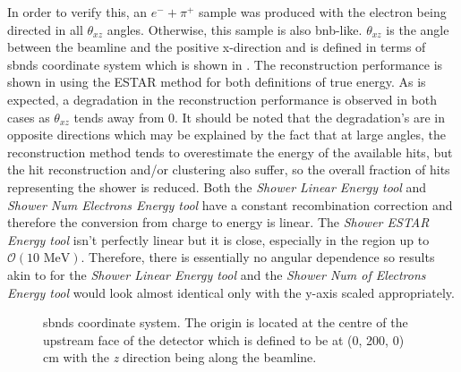 In order to verify this, an  $e^- + \pi^+$ sample was produced with the electron being directed in all $\theta_{xz}$ angles. Otherwise, this sample is also \gls{bnb}-like. $\theta_{xz}$ is the angle between the beamline and the positive x-direction and is defined in terms of \glspl{sbnd} coordinate system which is shown in . The reconstruction performance is shown in  using the ESTAR method for both definitions of true energy. As is expected, a degradation in the reconstruction performance is observed in both cases as $\theta_{xz}$ tends away from 0. It should be noted that the degradation's are in opposite directions which may be explained by the fact that at large angles, the reconstruction method tends to overestimate the energy of the available hits, but the hit reconstruction and/or clustering also suffer, so the overall fraction of hits representing the shower is reduced. Both the \textit{Shower Linear Energy tool} and \textit{Shower Num Electrons Energy tool} have a constant recombination correction and therefore the conversion from charge to energy is linear. The \textit{Shower ESTAR Energy tool} isn't perfectly linear but it is close, especially in the region up to $\mathcal{O}(10 \text{ MeV})$. Therefore, there is essentially no angular dependence so results akin to  for the \textit{Shower Linear Energy tool} and the \textit{Shower Num of Electrons Energy tool} would look almost identical only with the y-axis scaled appropriately. 
\begin{figure}[h!]
    \centering
    

    \caption[\glspl{sbnd} coordinate system]{\glspl{sbnd} coordinate system. The origin is located at the centre of the upstream face of the detector which is defined to be at (0, 200, 0) cm with the \textit{z} direction being along the beamline.}
    \label{fig:sbnd_coordinate_system}
\end{figure}


